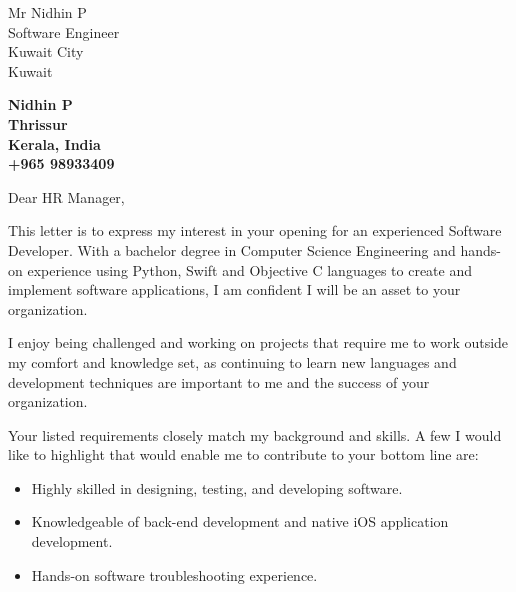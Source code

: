 \documentclass[11pt]{letter} %
\begin{document}

\begin{letter}{Mr Nidhin P \\
Software Engineer \\
Kuwait City \\
Kuwait} 


\begin{center}
\large\bf Nidhin P \\ %
Thrissur \\ Kerala, India \\ +965 98933409 %
\end{center} 
\vfill

\signature{Nidhin P} %


\opening{Dear HR Manager,} 
 
This letter is to express my interest in your opening for an experienced Software Developer. With a bachelor degree in Computer Science Engineering and hands-on experience using Python, Swift and Objective C languages to create and implement software applications, I am confident I will be an asset to your organization.

I enjoy being challenged and working on projects that require me to work outside my comfort and knowledge set, as continuing to learn new languages and development techniques are important to me and the success of your organization.
 
Your listed requirements closely match my background and skills. A few I would like to highlight that would enable me to contribute to your bottom line are:
\begin{itemize}
	\item{ Highly skilled in designing, testing, and developing software.}
	\item{ Knowledgeable of back-end development and native iOS application development.}
	\item{ Hands-on software troubleshooting experience.}
\end{itemize}


\end{letter}
\end{document}
